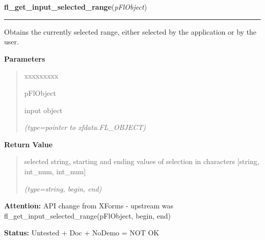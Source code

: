 \hspace{.8\funcindent}\begin{boxedminipage}{\funcwidth}

    \raggedright \textbf{fl\_get\_input\_selected\_range}(\textit{pFlObject})

    \vspace{-1.5ex}

    \rule{\textwidth}{0.5\fboxrule}
\setlength{\parskip}{2ex}
    Obtains the currently selected range, either selected by the 
    application or by the user.

\setlength{\parskip}{1ex}
      \textbf{Parameters}
      \vspace{-1ex}

      \begin{quote}
        \begin{Ventry}{xxxxxxxxx}

          \item[pFlObject]

          input object

            {\it (type=pointer to xfdata.FL\_OBJECT)}

        \end{Ventry}

      \end{quote}

      \textbf{Return Value}
    \vspace{-1ex}

      \begin{quote}
      selected string, starting and ending values of selection in 
      characters [string, int\_num, int\_num]

      {\it (type=string, begin, end)}

      \end{quote}

\textbf{Attention:} API change from XForms - upstream was 
fl\_get\_input\_selected\_range(pFlObject, begin, end)



\textbf{Status:} Untested + Doc + NoDemo = NOT OK



    \end{boxedminipage}

    \label{xformslib:flinput:fl_set_input_maxchars}

    \vspace{0.5ex}

